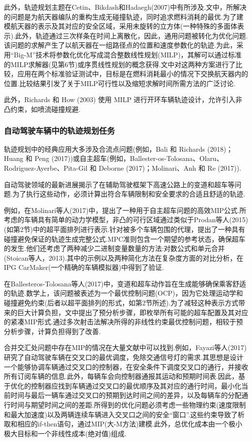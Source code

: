 \documentclass[10pt]{article}
\begin{document}
此外，轨迹规划主题在Cetin、Bikdash和Hadaegh(2007)中有所涉及.文中，所解决的问题是为航天器编队的重构生成无碰撞轨迹，同时追求燃料消耗的最优.为了建模航天器的表示及其对应的安全区域，采用未旋转的立方体(一种特殊的多面体表示).此外，轨迹通过三次样条在时间上离散化，因此，通用问题被转化为优化问题.该问题的求解产生了以航天器在一组路径点的位置和速度参数化的轨迹.为此，采用“Big-M”技术将参数化优化写成混合整数线性规划(MILP)，其解可以通过标准的MILP求解器(见第6节)或序贯线性规划的概念获得.文中对这两种方案进行了比较，应用在两个标准验证测试中，目标是在燃料消耗最小的情况下交换航天器内的位置.比较结果引发了关于MILP可行性以及缩短求解时间所需方法的广泛讨论.

此外，Richards 和 How (2003) 使用 MILP 进行开环车辆轨迹设计，允许引入非凸约束，如喷流碰撞规避.

\subsubsection*{自动驾驶车辆中的轨迹规划任务}

轨迹规划中的经典应用大多涉及合流点问题(例如，Bali 和 Richards (2018)；Huang 和 Peng (2017))或自主超车(例如，Ballester-os-Tolosana、Olaru、Rodriguez-Ayerbe、Pita-Gil 和 Deborne (2017)；Molinari、Anh 和 Re (2017)).

自动驾驶领域的最新进展揭示了在辅助驾驶框架下高速公路上的变道和超车等问题.为了执行这些动作，必须计算出符合车辆限制和安全要求的合适且舒适的轨迹.


例如，在Molinari等人(2017)中，提出了一种用于自主超车问题的高效MIP公式.所考虑的车辆具有简单的动力学模型，非凸的可行区域通过类似于Prodan等人(2015)(如第2节)中的超平面排列进行表示.针对被多个车辆包围的代理，提出了一种具有碰撞避免保证的轨迹生成完整公式.MPC准则包含一个期望的参考状态，确保超车的发生.他们还考虑了两种减少二进制变量数量的方法:对数公式和单元合并(Stoican等人，2013).其中的示例以及两种简化方法在复杂度方面的对比分析，在IPG CarMaker(一个精确的车辆模拟器)中得到了验证.

在Ballesteros-Tolosana等人(2017)中，变道和超车动作旨在生成能够确保乘客舒适的轨迹.数学上，该问题被表述为一个最优控制问题(OCP)，因为它处理运动学和碰撞避免约束(后者以超平面排列的形式，如第2节所述).为了减轻这种表示方式带来的巨大计算负担，文中提出了预分析步骤，即枚举所有可能的超车配置及其对应的紧凑MIP形式.通过多次射击法解决所得的非线性约束最优控制问题，相较于预分析步骤，计算负担得到了改善.

合并交汇处问题中存在MIP的情况在大量文献中可以找到.例如，Fayazi等人(2017)研究了自动驾驶车辆在交叉口的最优调度，免除交通信号灯的需求.其思想是设计一个能够协调车辆通过交叉口的控制器，在安全条件下调度交叉口的通行，并接收所有订阅车辆的信息.此外，每辆车会向控制器通报其运动和预期时间表.因此，基于优化的控制器应找到车辆通过交叉口的最优顺序及其对应的通行时间，最小化当前时间与最后一辆车通过交叉口的预期到达时间之间的差异，以及每辆车的分配通行时间与期望时间之间的差距.所得到的优化问题必须考虑一些物理约束(速度限制和最大加速度)以及两辆连续车辆进入交叉口之间的安全“窗口”.这些约束导致了析取和相应的if-then语句，通过MIP(大-M方法)建模.此外，总优化成本由一个极小极大目标和一个非线性成本(绝对值)组成.
\end{document}
